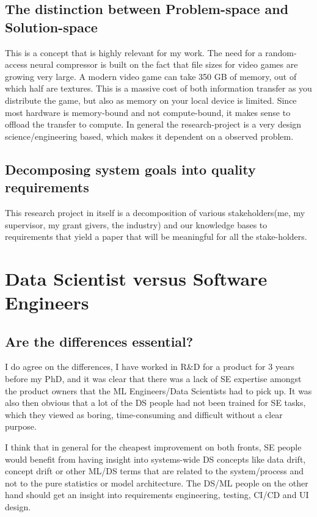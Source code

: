 \documentclass[a4paper, 11pt]{article} %
\begin{document}
\subsection{The distinction between Problem-space and Solution-space}
This is a concept that is highly relevant for my work. The need for a random-access neural compressor is built on the fact that file sizes for video games are growing very large.
A modern video game can take 350 GB of memory, out of which half are textures. This is a massive cost of both information transfer as you distribute the game, but also 
as memory on your local device is limited. Since most hardware is memory-bound and not compute-bound, it makes sense to offload the transfer to compute. 
In general the research-project is a very design science/engineering based, which makes it dependent on a observed problem.

\subsection{Decomposing system goals into quality requirements}
This research project in itself is a decomposition of various stakeholders(me, my supervisor, my grant givers, the industry) and our knowledge bases to requirements that yield a paper that
will be meaningful for all the stake-holders. 

\section{Data Scientist versus Software Engineers}

\subsection{Are the differences essential?}
I do agree on the differences, I have worked in R\&D for a product for 3 years before my PhD, and it was clear that there was a lack of SE expertise amongst the product owners that the ML Engineers/Data Scientists had to pick up.
It was also then obvious that a lot of the DS people had not been trained for SE tasks, which they viewed as boring, time-consuming and difficult without a clear purpose.

I think that in general for the cheapest improvement on both fronts, SE people would benefit from having insight into systems-wide DS concepts like data drift, concept drift
or other ML/DS terms that are related to the system/process and not to the pure statistics or model architecture. 
The DS/ML people on the other hand should get an insight into requirements engineering, testing, CI/CD and UI design.
\end{document}

